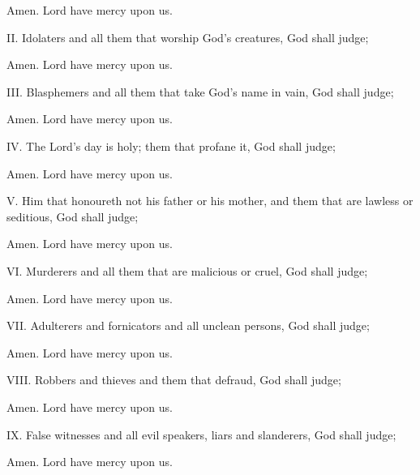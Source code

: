 






\centerline{}
\centerline{\R Amen.  Lord have mercy upon us.}

II. Idolaters and all them that worship God’s creatures, God shall judge;

\centerline{\R Amen.  Lord have mercy upon us.}

III. Blasphemers and all them that take God’s name in vain, God shall judge; 

\centerline{\R Amen.  Lord have mercy upon us.}

IV. The Lord’s day is holy; them that profane it, God shall judge;

\centerline{\R Amen.  Lord have mercy upon us.}

V. Him that honoureth not his father or his mother, and them that are lawless or seditious, God shall judge;

\centerline{\R Amen.  Lord have mercy upon us.}

VI. Murderers and all them that are malicious or cruel, God shall judge;

\centerline{\R Amen.  Lord have mercy upon us.}

VII. Adulterers and fornicators and all unclean persons, God shall judge;

\centerline{\R Amen.  Lord have mercy upon us.}

VIII. Robbers and thieves and them that defraud, God shall judge;

\centerline{\R Amen.  Lord have mercy upon us.}

IX. False witnesses and all evil speakers, liars and slanderers, God shall judge;

\centerline{\R Amen.  Lord have mercy upon us.}

